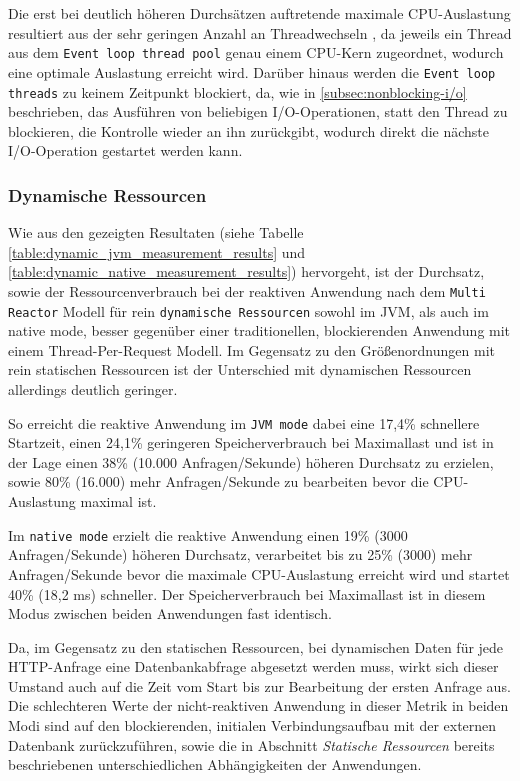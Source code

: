 Die erst bei deutlich höheren Durchsätzen auftretende maximale CPU-Auslastung resultiert aus der sehr geringen Anzahl an Threadwechseln
, da jeweils ein Thread aus dem \verb|Event loop thread pool| genau einem CPU-Kern zugeordnet, wodurch eine optimale Auslastung erreicht
wird. Darüber hinaus werden die \verb|Event loop threads| zu keinem Zeitpunkt blockiert, da, wie in \ref{subsec:nonblocking-i/o}
beschrieben, das Ausführen von beliebigen I/O-Operationen, statt den Thread zu blockieren, die Kontrolle wieder an ihn zurückgibt,
wodurch direkt die nächste I/O-Operation gestartet werden kann.

\subsubsection{Dynamische Ressourcen}
\label{subsubsec:auswertung_dynamic}
Wie aus den gezeigten Resultaten (siehe Tabelle \ref{table:dynamic_jvm_measurement_results} und
\ref{table:dynamic_native_measurement_results}) hervorgeht, ist der Durchsatz, sowie der Ressourcenverbrauch bei der
reaktiven Anwendung nach dem \verb|Multi Reactor| Modell für rein \verb|dynamische Ressourcen| sowohl im JVM, als auch im native mode,
besser gegenüber einer traditionellen, blockierenden Anwendung mit einem Thread-Per-Request Modell. Im Gegensatz zu den
Größenordnungen mit rein statischen Ressourcen ist der Unterschied mit dynamischen Ressourcen allerdings deutlich geringer.

So erreicht die reaktive Anwendung im \verb|JVM mode| dabei eine 17,4\% schnellere Startzeit, einen 24,1\% geringeren
Speicherverbrauch bei Maximallast und ist in der Lage einen 38\% (10.000 Anfragen/Sekunde) höheren Durchsatz zu erzielen,
sowie 80\% (16.000) mehr Anfragen/Sekunde zu bearbeiten bevor die CPU-Auslastung maximal ist.

Im \verb|native mode| erzielt die reaktive Anwendung einen 19\% (3000 Anfragen/Sekunde) höheren Durchsatz, verarbeitet bis zu
25\% (3000) mehr Anfragen/Sekunde bevor die maximale CPU-Auslastung erreicht wird und startet 40\% (18,2 ms) schneller.
Der Speicherverbrauch bei Maximallast ist in diesem Modus zwischen beiden Anwendungen fast identisch.

Da, im Gegensatz zu den statischen Ressourcen, bei dynamischen Daten für jede HTTP-Anfrage eine Datenbankabfrage abgesetzt werden
muss, wirkt sich dieser Umstand auch auf die Zeit vom Start bis zur Bearbeitung der ersten Anfrage aus.
Die schlechteren Werte der nicht-reaktiven Anwendung in dieser Metrik in beiden Modi sind auf den blockierenden, initialen
Verbindungsaufbau mit der externen Datenbank zurückzuführen, sowie die in Abschnitt \textit{Statische Ressourcen} bereits
beschriebenen unterschiedlichen Abhängigkeiten der Anwendungen.

